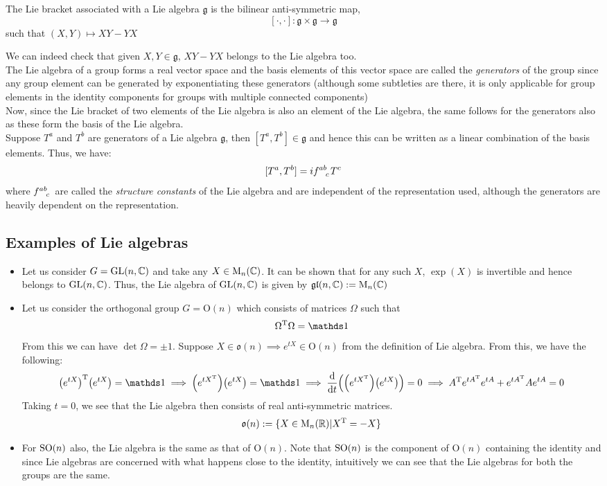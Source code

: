 \begin{definition}
    The Lie bracket associated with a Lie algebra $\mathfrak{g}$ is the bilinear anti-symmetric map,
    $$[\cdot , \cdot]: \mathfrak{g}\times \mathfrak{g} \to  \mathfrak{g}$$
    such that $(X,Y) \mapsto XY-YX$
\end{definition}
We can indeed check that given $X,Y\in \mathfrak{g}$, $XY-YX$ belongs to the Lie algebra too. \\[0.2cm]
The Lie algebra of a group forms a real vector space and the basis elements of this vector space are called the \textit{generators} of the group since any group element can be generated by exponentiating these generators (although some subtleties are there, it is only applicable for group elements in the identity components for groups with multiple connected components) \\[0.2cm]
Now, since the Lie bracket of two elements of the Lie algebra is also an element of the Lie algebra, the same follows for the generators also as these form the basis of the Lie algebra.\\[0.2cm] Suppose $T^a$ and $T^b$ are generators of a Lie algebra $\mathfrak{g}$, then $[T^a, T^b]\in \mathfrak{g}$ and hence this can be written as a linear combination of the basis elements. Thus, we have:
$$[T^a, T^b] = i \tensor{f}{^{ab}_c}T^c$$
where $\tensor{f}{^{ab}_c}$ are called the \textit{structure constants} of the Lie algebra and are independent of the representation used, although the generators are heavily dependent on the representation. 
\subsection{Examples of Lie algebras}
\begin{itemize}
    \item Let us consider $G = \mathrm{GL}(n,\mathbb{C})$ and take any $X\in \mathrm{M}_n(\mathbb{C})$. It can be shown that for any such $X$, $\exp(X)$ is invertible and hence belongs to $ \mathrm{GL}(n,\mathbb{C})$. Thus, the Lie algebra of $ \mathrm{GL}(n,\mathbb{C})$ is given by $\mathrm{\mathfrak{gl}}(n,\mathbb{C}) := \mathrm{M}_n(\mathbb{C})$
    \item Let us consider the orthogonal group $G = \mathrm{O}(n)$ which consists of matrices $\Omega$ such that $$\Omega^{\mathrm{T}}\Omega=\iden$$
    From this we can have $\det \Omega = \pm 1$. Suppose $X\in \mathfrak{o}(n)\implies e^{tX}\in \mathrm{O}(n)$ from the definition of Lie algebra. From this, we have the following: 
    $$\qty(e^{tX})^{\mathrm{T}} \qty(e^{tX})=\iden \implies \qty(e^{tX^{\mathrm{T}} })\qty(e^{tX}) = \iden \implies \dv{t}\qty(\qty(e^{tX^{\mathrm{T}} })\qty(e^{tX}))  = 0\implies A^{\mathrm{T}} e^{tA^{\mathrm{T}}}e^{tA}+e^{tA^{\mathrm{T}}}A e^{tA}=0$$
    Taking $t=0$, we see that the Lie algebra then consists of real anti-symmetric matrices. $$\mathfrak{o}(n):=\{X\in \mathrm{M}_n(\mathbb{R})| X^{\mathrm{T}} = -X\}$$
    \item For $\mathrm{SO}(n)$ also, the Lie algebra is the same as that of $\mathrm{O}(n)$. Note that $\mathrm{SO}(n)$ is the component of $\mathrm{O}(n)$ containing the identity and since Lie algebras are concerned with what happens close to the identity, intuitively we can see that the Lie algebras for both the groups are the same. 
\end{itemize}